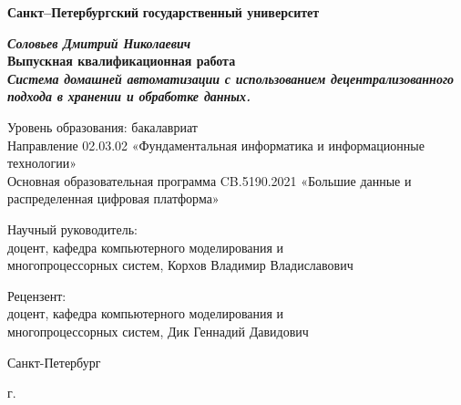 
\begin{titlepage}
\begin{center}

\textbf{Санкт--Петербургский}
\textbf{государственный университет}

\vspace{35mm}

\textbf{\textit{\large Соловьев Дмитрий Николаевич}} \\[8mm]
\textbf{\large Выпускная квалификационная работа}\\[3mm]
\textbf{\textit{\large Система домашней автоматизации с использованием децентрализованного подхода в хранении и обработке данных.}}

\vspace{20mm}
Уровень образования: бакалавриат\\
Направление 02.03.02  «Фундаментальная информатика и информационные технологии»\\
Основная образовательная программа CB.5190.2021
«Большие данные и распределенная цифровая платформа»\\[25mm]


\begin{flushright}
\begin{minipage}[t]{0.65\textwidth}
{Научный руководитель:} \\
доцент, кафедра компьютерного моделирования и \\многопроцессорных систем, Корхов Владимир Владиславович

\vspace{10mm}

{Рецензент:} \\
доцент, кафедра компьютерного моделирования и \\многопроцессорных систем, Дик Геннадий Давидович
\end{minipage}
\end{flushright}

\vfill 

{Санкт-Петербург}
\par{\the\year{} г.}
\end{center}
\end{titlepage}
\restoregeometry
\addtocounter{page}{1}
